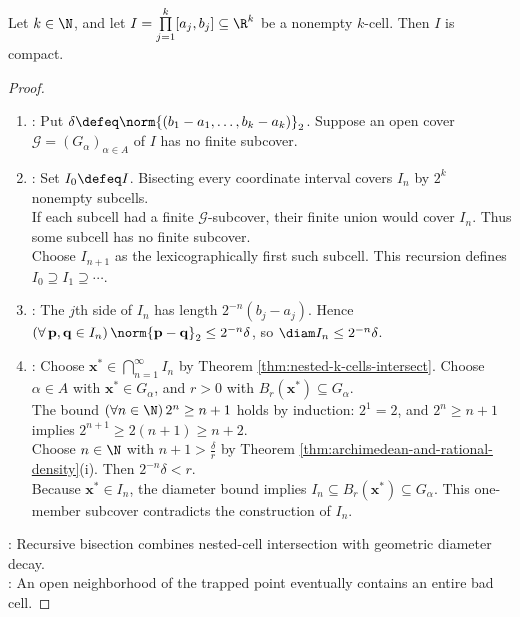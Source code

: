 \begin{theorem} \label{thm:k-cells-compact} \\
Let $k\in\N$, and let $I=\prod\limits_{j=1}^{k}[a_j,b_j]\subseteq\R^k$ be a nonempty $k$-cell. Then $I$ is compact.
\begin{proof}
\begin{enumerate}[label=(\roman*)]
\setlength{\itemsep}{0pt}
\item {}: Put $\delta\defeq\norm{(b_1-a_1,\ldots,b_k-a_k)}_2$. Suppose an open cover $\mathcal{G}=(G_\alpha)_{\alpha\in A}$ of $I$ has no finite subcover.
\item {}: Set $I_0\defeq I$. Bisecting every coordinate interval covers $I_n$ by $2^k$ nonempty subcells.\\
If each subcell had a finite $\mathcal{G}$-subcover, their finite union would cover $I_n$. Thus some subcell has no finite subcover.\\
Choose $I_{n+1}$ as the lexicographically first such subcell. This recursion defines $I_0\supseteq I_1\supseteq\cdots$.
\item {}: The $j$th side of $I_n$ has length $2^{-n}(b_j-a_j)$. Hence $(\forall\,\mathbf{p},\mathbf{q}\in I_n)\,\norm{\mathbf{p}-\mathbf{q}}_2\leq2^{-n}\delta$, so $\diam I_n\leq2^{-n}\delta$.
\item {}: Choose $\mathbf{x}^*\in\bigcap\limits_{n=1}^{\infty}I_n$ by Theorem \ref{thm:nested-k-cells-intersect}. Choose $\alpha\in A$ with $\mathbf{x}^*\in G_\alpha$, and $r>0$ with $B_r(\mathbf{x}^*)\subseteq G_\alpha$.\\
The bound $(\forall n\in\N)\,2^n\geq n+1$ holds by induction: $2^1=2$, and $2^n\geq n+1$ implies $2^{n+1}\geq2(n+1)\geq n+2$.\\
Choose $n\in\N$ with $n+1>\frac{\delta}{r}$ by Theorem \ref{thm:archimedean-and-rational-density}(i). Then $2^{-n}\delta<r$.\\
Because $\mathbf{x}^*\in I_n$, the diameter bound implies $I_n\subseteq B_r(\mathbf{x}^*)\subseteq G_\alpha$. This one-member subcover contradicts the construction of $I_n$.
\end{enumerate}
: Recursive bisection combines nested-cell intersection with geometric diameter decay.\\
: An open neighborhood of the trapped point eventually contains an entire bad cell.
\end{proof}
\end{theorem}

